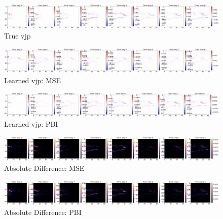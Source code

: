 \documentclass[
]{article}
\begin{document}
\begin{figure}[H]

{\centering \includegraphics[width=1\textwidth,height=\textheight]{../../plot/GCS_channel_plot/training/MSE/true_vjp_1.png}

}

\caption{True vjp}

\end{figure}%
\begin{figure}[H]

{\centering \includegraphics[width=1\textwidth,height=\textheight]{../../plot/GCS_channel_plot/training/MSE/learned_vjp_990.png}

}

\caption{Learned vjp: MSE}

\end{figure}%
\begin{figure}[H]

{\centering \includegraphics[width=1\textwidth,height=\textheight]{../../plot/GCS_channel_plot/training/JAC/learned_vjp_990.png}

}

\caption{Learned vjp: PBI}

\end{figure}%
\begin{figure}[H]

{\centering \includegraphics[width=1\textwidth,height=\textheight]{../../plot/GCS_channel_plot/training/MSE/diff_vjp_990.png}

}

\caption{Absolute Difference: MSE}

\end{figure}%
\begin{figure}[H]

{\centering \includegraphics[width=1\textwidth,height=\textheight]{../../plot/GCS_channel_plot/training/JAC/diff_vjp_990.png}

}

\caption{Absolute Difference: PBI}

\end{figure}%
\end{document}
